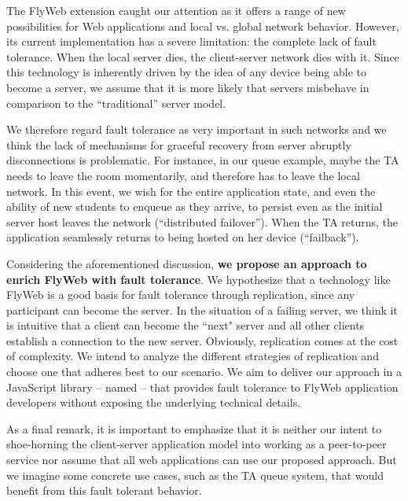 The FlyWeb extension caught our attention as it offers a range of new possibilities for Web applications and local vs. global network behavior. However, its current implementation has a severe limitation: the complete lack of fault tolerance. When the local server dies, the client-server network dies with it. Since this technology is inherently driven by the idea of any device being able to become a server, we assume that it is more likely that servers misbehave in comparison to the  ``traditional'' server model. 



We therefore regard fault tolerance as very important in such networks and we think the lack of mechanisms for graceful recovery from server abruptly disconnections is problematic.
For instance, in our queue example, maybe the TA needs to leave the room momentarily, and therefore has to leave the local network. In this event, we wish for the entire application state, and even the ability of new students to enqueue as they arrive, to persist even as the initial server host leaves the network (``distributed failover''). When the TA returns, the application seamlessly returns to being hosted on her device (``failback''). 


Considering the aforementioned discussion, {\bf we propose an approach to enrich FlyWeb with fault tolerance}. We hypothesize that a technology like FlyWeb is a good basis for fault tolerance through replication, since any participant can become the server. In the situation of a failing server, we think it is intuitive that a client can become the ``next" server and all other clients establish a connection to the new server. Obviously, replication comes at the cost of complexity. We intend to analyze the different strategies of replication and choose one that adheres best to our scenario. We aim to deliver our approach in a JavaScript library -- named {\texttt{\APIName{}}} -- that provides fault tolerance to FlyWeb application developers without exposing the underlying technical details.



As a final remark, it is important to emphasize that it is neither our intent to shoe-horning the client-server application model into working as a peer-to-peer service nor assume that all web applications can use our proposed approach. But we imagine some concrete use cases, such as the TA queue system, that would benefit from this fault tolerant behavior.